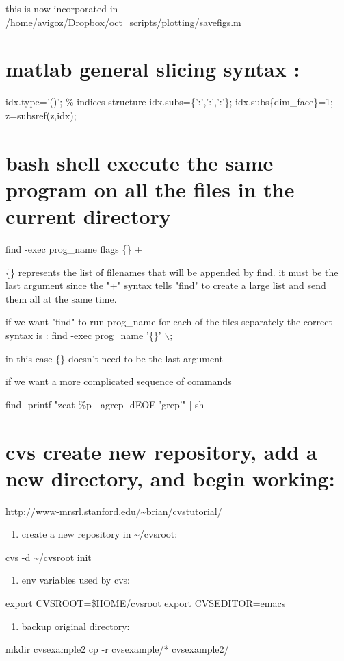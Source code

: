 \documentclass[11pt]{article}
\begin{document}
this is now incorporated in 
/home/avigoz/Dropbox/oct\_scripts/plotting/savefigs.m
\section{matlab general slicing syntax :}
\label{sec-4}

idx.type='()';                  \% indices structure
idx.subs=\{':',':',':'\};
idx.subs\{dim\_face\}=1;
z=subsref(z,idx);

\section{bash shell execute the same program on all the files in the current directory}
\label{sec-5}

find -exec prog\_name flags \{\} +

\{\} represents the list of filenames that will be appended by find. it must be the last argument since the "+" syntax tells "find" to create a large list and send them all at the same time.

 if we want "find" to run prog\_name for each of the files separately the correct syntax is :
find -exec prog\_name '\{\}' $\backslash$;

in this case \{\} doesn't need to be the last argument

if we want a more complicated sequence of commands

find -printf "zcat \%p | agrep -dEOE 'grep'\n" | sh

\section{cvs create new repository, add a new directory, and begin working:}
\label{sec-6}
\url{http://www-mrsrl.stanford.edu/~brian/cvstutorial/}

\begin{enumerate}
\item create a new repository in \textasciitilde{}/cvsroot:
\end{enumerate}

cvs -d \textasciitilde{}/cvsroot init

\begin{enumerate}
\item env variables used by cvs:
\end{enumerate}

export CVSROOT=\$HOME/cvsroot
export CVSEDITOR=emacs

\begin{enumerate}
\item backup original directory:
\end{enumerate}
mkdir cvsexample2
cp -r cvsexample/* cvsexample2/
\end{document}
